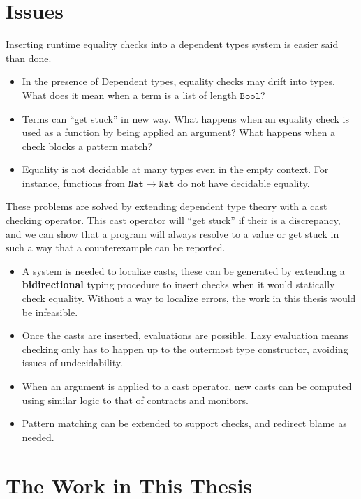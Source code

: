 \section{Issues}

Inserting runtime equality checks into a dependent types system is easier said than done.
\begin{itemize}
\item In the presence of Dependent types, equality checks may drift into types.
What does it mean when a term is a list of length $\mathtt{Bool}$?
\item Terms can ``get stuck'' in new way.
What happens when an equality check is used as a function by being applied an argument?
What happens when a check blocks a pattern match?
\item Equality is not decidable at many types even in the empty context.
For instance, functions from $\mathtt{Nat}\rightarrow\mathtt{Nat}$ do not have decidable equality.
\end{itemize}
These problems are solved by extending dependent type theory with a cast checking operator.
This cast operator will ``get stuck'' if their is a discrepancy, and we can show that a program will always resolve to a value or get stuck in such a way that a counterexample can be reported.
\begin{itemize}
\item A system is needed to localize casts, these can be generated by extending a \textbf{bidirectional} typing procedure to insert checks when it would statically check equality.
Without a way to localize errors, the work in this thesis would be infeasible.
\item Once the casts are inserted, evaluations are possible.
Lazy evaluation means checking only has to happen up to the outermost type constructor, avoiding issues of undecidability.
\item When an argument is applied to a cast operator, new casts can be computed using similar logic to that of contracts and monitors\cite{10.1145/581478.581484}.
\item Pattern matching can be extended to support checks, and redirect blame as needed.
\end{itemize}

\section{The Work in This Thesis}

